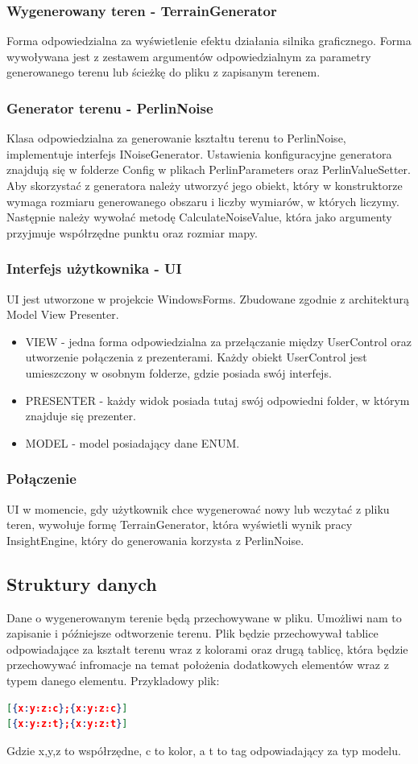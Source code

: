 \documentclass[12pt,a4paper]{article}
\begin{document}
\subsubsection{Wygenerowany teren - TerrainGenerator}
Forma odpowiedzialna za wyświetlenie efektu działania silnika graficznego. Forma wywoływana jest z zestawem argumentów odpowiedzialnym za parametry generowanego terenu lub ścieżkę do pliku z zapisanym terenem.
\subsubsection{Generator terenu - PerlinNoise}
Klasa odpowiedzialna za generowanie kształtu terenu to PerlinNoise, implementuje interfejs INoiseGenerator. Ustawienia konfiguracyjne generatora znajdują się w folderze Config w plikach PerlinParameters oraz PerlinValueSetter.
Aby skorzystać z generatora należy utworzyć jego obiekt, który w konstruktorze wymaga rozmiaru generowanego obszaru i liczby wymiarów, w których liczymy. Następnie należy wywołać metodę CalculateNoiseValue, która jako argumenty przyjmuje współrzędne punktu oraz rozmiar mapy.
\subsubsection{Interfejs użytkownika - UI}
UI jest utworzone w projekcie WindowsForms. Zbudowane zgodnie z architekturą Model View Presenter. \begin{itemize}
\item VIEW - jedna forma odpowiedzialna za przełączanie między UserControl oraz utworzenie połączenia z prezenterami. Każdy obiekt UserControl jest umieszczony w osobnym folderze, gdzie posiada swój interfejs.
\item PRESENTER - każdy widok posiada tutaj swój odpowiedni folder, w którym znajduje się prezenter.
\item MODEL - model posiadający dane ENUM.
\end{itemize}
\subsubsection{Połączenie}
UI w momencie, gdy użytkownik chce wygenerować nowy lub wczytać z pliku teren, wywołuje formę TerrainGenerator, która wyświetli wynik pracy InsightEngine, który do generowania korzysta z PerlinNoise.
\subsection{Struktury danych}
Dane o wygenerowanym terenie będą przechowywane w pliku. Umożliwi nam to zapisanie i późniejsze odtworzenie terenu. Plik będzie przechowywał tablice odpowiadające za kształt terenu wraz z kolorami oraz drugą tablicę, która będzie przechowywać infromacje na temat położenia dodatkowych elementów wraz z typem danego elementu. Przykladowy plik:
\begin{lstlisting}[language=json,firstnumber=1]
[{x:y:z:c};{x:y:z:c}]
[{x:y:z:t};{x:y:z:t}]
\end{lstlisting}
Gdzie x,y,z to współrzędne, c to kolor, a t to tag odpowiadający za typ modelu.
\end{document}
